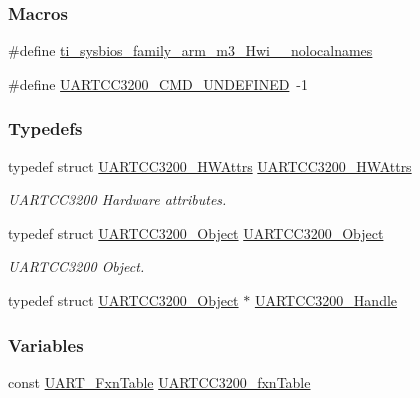 \subsubsection*{Macros}
\begin{DoxyCompactItemize}
\item 
\#define \hyperlink{_u_a_r_t_c_c3200_8h_aaa17ecf48f5762e2e1bdb0bab8aacf0c}{ti\-\_\-sysbios\-\_\-family\-\_\-arm\-\_\-m3\-\_\-\-Hwi\-\_\-\-\_\-nolocalnames}
\item 
\#define \hyperlink{_u_a_r_t_c_c3200_8h_a48d94a72ec44ec99ea03345aee391a62}{U\-A\-R\-T\-C\-C3200\-\_\-\-C\-M\-D\-\_\-\-U\-N\-D\-E\-F\-I\-N\-E\-D}~-\/1
\end{DoxyCompactItemize}
\subsubsection*{Typedefs}
\begin{DoxyCompactItemize}
\item 
typedef struct \hyperlink{struct_u_a_r_t_c_c3200___h_w_attrs}{U\-A\-R\-T\-C\-C3200\-\_\-\-H\-W\-Attrs} \hyperlink{_u_a_r_t_c_c3200_8h_a4314d1c1487378758af75f900158e582}{U\-A\-R\-T\-C\-C3200\-\_\-\-H\-W\-Attrs}
\begin{DoxyCompactList}\small\item\em U\-A\-R\-T\-C\-C3200 Hardware attributes. \end{DoxyCompactList}\item 
typedef struct \hyperlink{struct_u_a_r_t_c_c3200___object}{U\-A\-R\-T\-C\-C3200\-\_\-\-Object} \hyperlink{_u_a_r_t_c_c3200_8h_ab955379efacdd1121191c43ef60c6389}{U\-A\-R\-T\-C\-C3200\-\_\-\-Object}
\begin{DoxyCompactList}\small\item\em U\-A\-R\-T\-C\-C3200 Object. \end{DoxyCompactList}\item 
typedef struct \hyperlink{struct_u_a_r_t_c_c3200___object}{U\-A\-R\-T\-C\-C3200\-\_\-\-Object} $\ast$ \hyperlink{_u_a_r_t_c_c3200_8h_a7918e9066f5ecdeaba9075bf4fe71157}{U\-A\-R\-T\-C\-C3200\-\_\-\-Handle}
\end{DoxyCompactItemize}
\subsubsection*{Variables}
\begin{DoxyCompactItemize}
\item 
const \hyperlink{struct_u_a_r_t___fxn_table}{U\-A\-R\-T\-\_\-\-Fxn\-Table} \hyperlink{_u_a_r_t_c_c3200_8h_af5c9fcf73d2540d179ec24ef172f1299}{U\-A\-R\-T\-C\-C3200\-\_\-fxn\-Table}
\end{DoxyCompactItemize}


